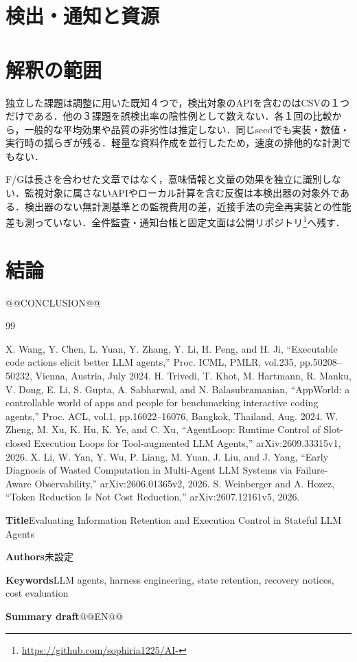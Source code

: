 \documentclass[uplatex,a4paper,twocolumn,10pt]{jsarticle}
\begin{document}
\section{検出・通知と資源}



\section{解釈の範囲}
独立した課題は調整に用いた既知４つで，検出対象のAPIを含むのはCSVの１つだけである．他の３課題を誤検出率の陰性例として数えない．各１回の比較から，一般的な平均効果や品質の非劣性は推定しない．同じseedでも実装・数値・実行時の揺らぎが残る．軽量な資料作成を並行したため，速度の排他的な計測でもない．

F/Gは長さを合わせた文章ではなく，意味情報と文量の効果を独立に識別しない．監視対象に属さないAPIやローカル計算を含む反復は本検出器の対象外である．検出器のない無計測基準との監視費用の差，近接手法の完全再実装との性能差も測っていない．全件監査・通知台帳と固定文面は公開リポジトリ\footnote{\url{https://github.com/sophiria1225/AI-}}へ残す．

\section{結論}
@@CONCLUSION@@

\begin{thebibliography}{99}
\raggedright
{} X. Wang, Y. Chen, L. Yuan, Y. Zhang, Y. Li, H. Peng, and H. Ji, ``Executable code actions elicit better LLM agents,'' Proc. ICML, PMLR, vol.235, pp.50208--50232, Vienna, Austria, July 2024.
 H. Trivedi, T. Khot, M. Hartmann, R. Manku, V. Dong, E. Li, S. Gupta, A. Sabharwal, and N. Balasubramanian, ``AppWorld: a controllable world of apps and people for benchmarking interactive coding agents,'' Proc. ACL, vol.1, pp.16022--16076, Bangkok, Thailand, Aug. 2024.
 W. Zheng, M. Xu, K. Hu, K. Ye, and C. Xu, ``AgentLoop: Runtime Control of Slot-closed Execution Loops for Tool-augmented LLM Agents,'' arXiv:2609.33315v1, 2026.
 X. Li, W. Yan, Y. Wu, P. Liang, M. Yuan, J. Liu, and J. Yang, ``Early Diagnosis of Wasted Computation in Multi-Agent LLM Systems via Failure-Aware Observability,'' arXiv:2606.01365v2, 2026.
 S. Weinberger and A. Hozez, ``Token Reduction Is Not Cost Reduction,'' arXiv:2607.12161v5, 2026.
\end{thebibliography}

\clearpage
\onecolumn
\noindent\textbf{Title}\quad Evaluating Information Retention and Execution Control in Stateful LLM Agents

\noindent\textbf{Authors}\quad 未設定

\noindent\textbf{Keywords}\quad LLM agents, harness engineering, state retention, recovery notices, cost evaluation

\noindent\textbf{Summary draft}\quad @@EN@@
\end{document}
